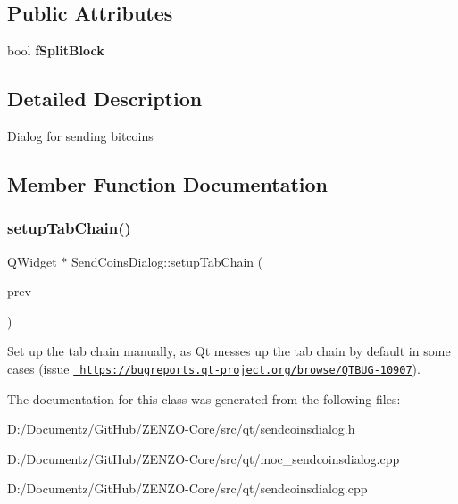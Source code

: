 \subsection*{Public Attributes}
\begin{DoxyCompactItemize}
\item 
\mbox{\label{class_send_coins_dialog_aed1a37c023b2546607356f83874c0721}} 
bool {\bfseries f\+Split\+Block}
\end{DoxyCompactItemize}


\subsection{Detailed Description}
Dialog for sending bitcoins 

\subsection{Member Function Documentation}
\mbox{\label{class_send_coins_dialog_a689658987f2af0896f25bf37bb945d91}} 
\subsubsection{\texorpdfstring{setupTabChain()}{setupTabChain()}}
{\footnotesize\ttfamily Q\+Widget $\ast$ Send\+Coins\+Dialog\+::setup\+Tab\+Chain (\begin{DoxyParamCaption}\item[{Q\+Widget $\ast$}]{prev }\end{DoxyParamCaption})}

Set up the tab chain manually, as Qt messes up the tab chain by default in some cases (issue \href{https://bugreports.qt-project.org/browse/QTBUG-10907}{\texttt{ https\+://bugreports.\+qt-\/project.\+org/browse/\+Q\+T\+B\+U\+G-\/10907}}). 

The documentation for this class was generated from the following files\+:\begin{DoxyCompactItemize}
\item 
D\+:/\+Documentz/\+Git\+Hub/\+Z\+E\+N\+Z\+O-\/\+Core/src/qt/sendcoinsdialog.\+h\item 
D\+:/\+Documentz/\+Git\+Hub/\+Z\+E\+N\+Z\+O-\/\+Core/src/qt/moc\+\_\+sendcoinsdialog.\+cpp\item 
D\+:/\+Documentz/\+Git\+Hub/\+Z\+E\+N\+Z\+O-\/\+Core/src/qt/sendcoinsdialog.\+cpp\end{DoxyCompactItemize}
